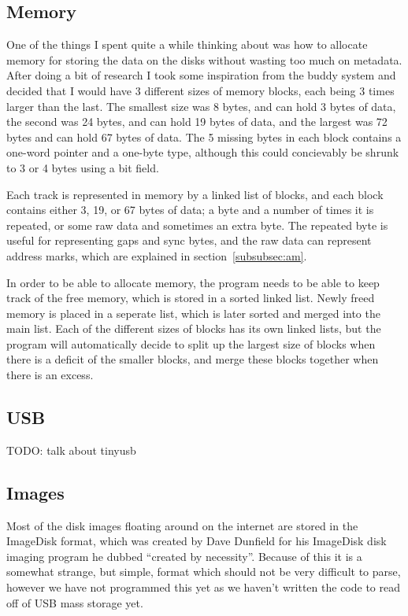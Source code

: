 \documentclass[a4paper]{article}
\begin{document}
\subsection{Memory}

One of the things I spent quite a while thinking about was how to
allocate memory for storing the data on the disks without wasting too
much on metadata. After doing a bit of research I took some
inspiration from the buddy system and decided that I would have 3
different sizes of memory blocks, each being 3 times larger than the
last. The smallest size was 8 bytes, and can hold 3 bytes of data, the
second was 24 bytes, and can hold 19 bytes of data, and the largest
was 72 bytes and can hold 67 bytes of data. The 5 missing bytes in
each block contains a one-word pointer and a one-byte type, although
this could concievably be shrunk to 3 or 4 bytes using a bit field.

Each track is represented in memory by a linked list of blocks, and
each block contains either 3, 19, or 67 bytes of data; a byte and a
number of times it is repeated, or some raw data and sometimes an
extra byte. The repeated byte is useful for representing gaps and sync
bytes, and the raw data can represent address marks, which are
explained in section~\ref{subsubsec:am}.

In order to be able to allocate memory, the program needs to be able
to keep track of the free memory, which is stored in a sorted linked
list. Newly freed memory is placed in a seperate list, which is
later sorted and merged into the main list. Each of the different
sizes of blocks has its own linked lists, but the program will
automatically decide to split up the largest size of blocks when there
is a deficit of the smaller blocks, and merge these blocks together
when there is an excess.

\subsection{USB}

TODO: talk about tinyusb

\subsection{Images}

Most of the disk images floating around on the internet are stored in
the ImageDisk format, which was created by Dave Dunfield for his
ImageDisk disk imaging program he dubbed ``created by
necessity''. Because of this it is a somewhat strange, but simple,
format which should not be very difficult to parse, however we have
not programmed this yet as we haven't written the code to read off of
USB mass storage yet.
\end{document}
